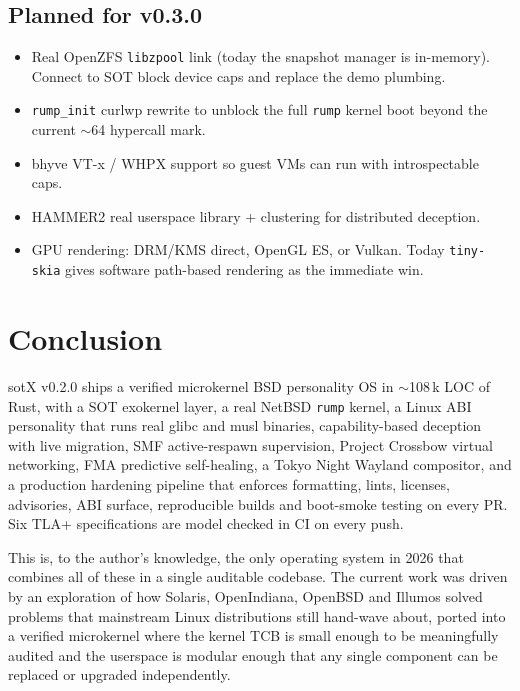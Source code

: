 \documentclass[11pt,a4paper]{article}
\begin{document}
\subsection{Planned for v0.3.0}

\begin{itemize}[leftmargin=1.4em,itemsep=0.3em]
  \item Real OpenZFS \texttt{libzpool} link (today the snapshot
        manager is in-memory). Connect to SOT block device caps and
        replace the demo plumbing.
  \item \texttt{rump\_init} curlwp rewrite to unblock the full
        \texttt{rump} kernel boot beyond the current $\sim$64
        hypercall mark.
  \item bhyve VT-x / WHPX support so guest VMs can run with
        introspectable caps.
  \item HAMMER2 real userspace library + clustering for
        distributed deception.
  \item GPU rendering: DRM/KMS direct, OpenGL ES, or Vulkan. Today
        \texttt{tiny-skia} gives software path-based rendering as
        the immediate win.
\end{itemize}

\section{Conclusion}

sotX v0.2.0 ships a verified microkernel BSD personality OS in
$\sim$108\,k LOC of Rust, with a SOT exokernel layer, a real NetBSD
\texttt{rump} kernel, a Linux ABI personality that runs real glibc
and musl binaries, capability-based deception with live migration,
SMF active-respawn supervision, Project Crossbow virtual networking,
FMA predictive self-healing, a Tokyo Night Wayland compositor, and a
production hardening pipeline that enforces formatting, lints,
licenses, advisories, ABI surface, reproducible builds and
boot-smoke testing on every PR. Six TLA+ specifications are model
checked in CI on every push.

This is, to the author's knowledge, the only operating system in 2026
that combines all of these in a single auditable codebase. The current
work was driven by an exploration of how Solaris, OpenIndiana, OpenBSD
and Illumos solved problems that mainstream Linux distributions still
hand-wave about, ported into a verified microkernel where the kernel
TCB is small enough to be meaningfully audited and the userspace is
modular enough that any single component can be replaced or
upgraded independently.
\end{document}
